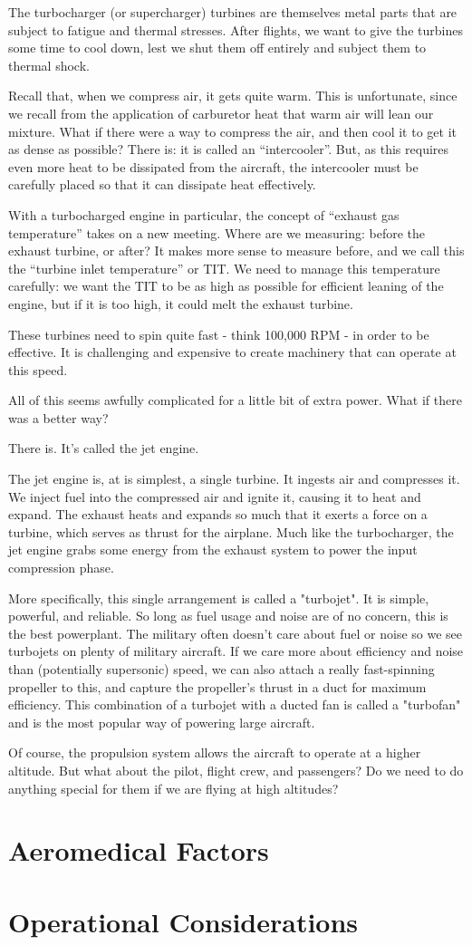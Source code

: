 The turbocharger (or supercharger) turbines are themselves metal parts that are subject to fatigue and thermal stresses. After flights, we want to give the turbines some time to cool down, lest we shut them off entirely and subject them to thermal shock.

Recall that, when we compress air, it gets quite warm. This is unfortunate, since we recall from the application of carburetor heat that warm air will lean our mixture. What if there were a way to compress the air, and then cool it to get it as dense as possible? There is: it is called an ``intercooler''. But, as this requires even more heat to be dissipated from the aircraft, the intercooler must be carefully placed so that it can dissipate heat effectively.

With a turbocharged engine in particular, the concept of ``exhaust gas temperature'' takes on a new meeting. Where are we measuring: before the exhaust turbine, or after? It makes more sense to measure before, and we call this the ``turbine inlet temperature'' or TIT. We need to manage this temperature carefully: we want the TIT to be as high as possible for efficient leaning of the engine, but if it is too high, it could melt the exhaust turbine.

These turbines need to spin quite fast - think 100,000 RPM - in order to be effective. It is challenging and expensive to create machinery that can operate at this speed.

All of this seems awfully complicated for a little bit of extra power. What if there was a better way?

There is. It's called the jet engine.

The jet engine is, at is simplest, a single turbine. It ingests air and compresses it. We inject fuel into the compressed air and ignite it, causing it to heat and expand. The exhaust heats and expands so much that it exerts a force on a turbine, which serves as thrust for the airplane. Much like the turbocharger, the jet engine grabs some energy from the exhaust system to power the input compression phase.

More specifically, this single arrangement is called a "turbojet". It is simple, powerful, and reliable. So long as fuel usage and noise are of no concern, this is the best powerplant. The military often doesn't care about fuel or noise so we see turbojets on plenty of military aircraft. If we care more about efficiency and noise than (potentially supersonic) speed, we can also attach a really fast-spinning propeller to this, and capture the propeller's thrust in a duct for maximum efficiency. This combination of a turbojet with a ducted fan is called a "turbofan" and is the most popular way of powering large aircraft.

Of course, the propulsion system allows the aircraft to operate at a higher altitude. But what about the pilot, flight crew, and passengers? Do we need to do anything special for them if we are flying at high altitudes?

\section{Aeromedical Factors}

\section{Operational Considerations}

